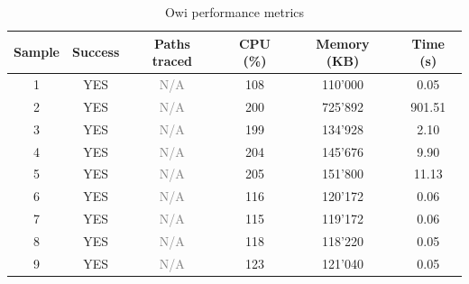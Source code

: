 \begin{table}[htbp]
    \centering
    \begin{tabular}{c|c|c|c|c|c}
        Sample & Success & Paths traced & CPU (\%) & Memory (KB) & Time (s)\footnotemark[10] \\
        \hline
        \hline
        1 & YES & \textcolor{gray}{N/A} & 108 & 110'000 & 0.05 \\
        2 & YES & \textcolor{gray}{N/A} & 200 & 725'892 & 901.51 \\
        3 & YES & \textcolor{gray}{N/A} & 199 & 134'928 & 2.10 \\
        4 & YES & \textcolor{gray}{N/A} & 204 & 145'676 & 9.90 \\
        5 & YES & \textcolor{gray}{N/A} & 205 & 151'800 & 11.13 \\
        6 & YES & \textcolor{gray}{N/A} & 116 & 120'172 & 0.06 \\
        7 & YES & \textcolor{gray}{N/A} & 115 & 119'172 & 0.06 \\
        8 & YES & \textcolor{gray}{N/A} & 118 & 118'220 & 0.05 \\
        9 & YES & \textcolor{gray}{N/A} & 123 & 121'040 & 0.05 \\
    \end{tabular}
    \caption{Owi performance metrics}
    \label{tab:owi_performance}
\end{table}

